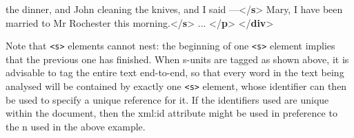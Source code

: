 \documentclass[11pt,twoside]{article}\makeatletter
\begin{document}
\begin{shaded}
\hspace*{1em}\hspace*{1em}\hspace*{1em}\hspace*{1em} the dinner, and John cleaning the knives,\mbox{}\newline 
\hspace*{1em}\hspace*{1em}\hspace*{1em}\hspace*{1em} and I said —{</\textbf{s}>}\mbox{}\newline 
{}\mbox{}\newline 
{}\mbox{}\newline 
\hspace*{1em}\mbox{}\newline 
\hspace*{1em}\hspace*{1em}Mary, I have been married to Mr Rochester\mbox{}\newline 
\hspace*{1em}\hspace*{1em}\hspace*{1em}\hspace*{1em}\hspace*{1em}\hspace*{1em} this morning.{</\textbf{s}>}\mbox{}\newline 
\hspace*{1em} ... {</\textbf{p}>}\mbox{}\newline 
{</\textbf{div}>}\end{shaded}\egroup\par \noindent  
Note that  \texttt{<s>}
elements cannot nest: the beginning of one \texttt{<s>} element implies
that the previous one has finished. When s-units are tagged as shown
above, it is advisable to tag the entire text end-to-end, so that
every word in the text being analysed will be contained by exactly one
\texttt{<s>} element, whose identifier can then be used to specify a
unique reference for it. If the identifiers used are unique within the
document, then the xml:id attribute might be used in
preference to the n used in the above  example.
\end{document}
